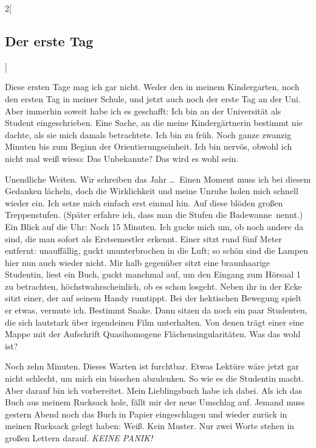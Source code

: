 \begin{multicols}{2}[\subsection{Der erste Tag}]

Diese ersten Tage mag ich gar nicht. Weder den in meinem Kindergarten, noch den
ersten Tag in meiner Schule, und jetzt auch noch der erste Tag an der Uni. Aber
immerhin soweit habe ich es geschafft: Ich bin an der Universität als Student
eingeschrieben. Eine Sache, an die meine Kindergärtnerin bestimmt nie dachte,
als sie mich damals betrachtete. Ich bin zu früh. Noch ganze zwanzig Minuten
bis zum Beginn der Orientierungseinheit.  Ich bin nervös, obwohl ich nicht mal
weiß wieso: Das Unbekannte? Das wird es wohl sein.

Unendliche Weiten. Wir schreiben das Jahr \thisYear \dots\ Einen Moment muss
ich bei diesem Gedanken lächeln, doch die Wirklichkeit und meine Unruhe holen
mich schnell wieder ein.  Ich setze mich einfach erst einmal hin.  Auf diese
blöden großen Treppenstufen. (Später erfahre ich, dass man die Stufen \glqq die
Badewanne\grqq\ nennt.) Ein Blick auf die Uhr: Noch 15 Minuten. Ich gucke mich
um, ob noch andere da sind, die man sofort als Erstsemestler erkennt. Einer
sitzt rund fünf Meter entfernt: unauffällig, guckt ununterbrochen in die Luft;
so schön sind die Lampen hier nun auch wieder nicht. Mir halb gegenüber sitzt
eine braunhaarige Studentin, liest ein Buch, guckt manchmal auf, um den Eingang
zum Hörsaal 1 zu betrachten, höchstwahrscheinlich, ob es schon losgeht. Neben
ihr in der Ecke sitzt einer, der auf seinem Handy rumtippt. Bei der hektischen
Bewegung spielt er etwas, vermute ich.  Bestimmt Snake. Dann sitzen da noch ein
paar Studenten, die sich lautstark über irgendeinen Film unterhalten. Von denen
trägt einer eine Mappe mit der Aufschrift \glqq Quasihomogene
Flächensingularitäten\grqq. Was das wohl ist?

Noch zehn Minuten. Dieses Warten ist furchtbar. Etwas Lektüre wäre jetzt gar
nicht schlecht, um mich ein bisschen abzulenken. So wie es die Studentin macht.
Aber darauf bin ich vorbereitet. Mein Lieblingsbuch habe ich dabei. Als ich das
Buch aus meinem Rucksack hole, fällt mir der neue Umschlag auf. Jemand muss
gestern Abend noch das Buch in Papier eingeschlagen und wieder zurück in meinen
Rucksack gelegt haben: Weiß. Kein Muster. Nur zwei Worte stehen in großen
Lettern darauf. \emph{KEINE PANIK!}


\end{multicols}
